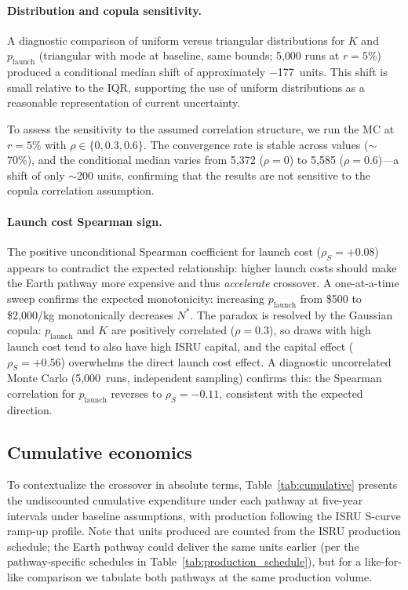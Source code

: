 \documentclass[preprint,12pt]{elsarticle}
\begin{document}
\paragraph{Distribution and copula sensitivity.} A diagnostic comparison of uniform versus triangular distributions for $K$ and $p_{\mathrm{launch}}$ (triangular with mode at baseline, same bounds; 5{,}000 runs at $r = 5\%$) produced a conditional median shift of approximately $-$177~units. This shift is small relative to the IQR, supporting the use of uniform distributions as a reasonable representation of current uncertainty.

To assess the sensitivity to the assumed correlation structure, we run the MC at $r = 5\%$ with $\rho \in \{0, 0.3, 0.6\}$. The convergence rate is stable across values ($\sim$70\%), and the conditional median varies from 5{,}372 ($\rho = 0$) to 5{,}585 ($\rho = 0.6$)---a shift of only $\sim$200 units, confirming that the results are not sensitive to the copula correlation assumption.

\paragraph{Launch cost Spearman sign.} The positive unconditional Spearman coefficient for launch cost ($\rho_S = +0.08$) appears to contradict the expected relationship: higher launch costs should make the Earth pathway more expensive and thus \emph{accelerate} crossover. A one-at-a-time sweep confirms the expected monotonicity: increasing $p_{\mathrm{launch}}$ from \$500 to \$2{,}000/kg monotonically decreases $N^*$. The paradox is resolved by the Gaussian copula: $p_{\mathrm{launch}}$ and $K$ are positively correlated ($\rho = 0.3$), so draws with high launch cost tend to also have high ISRU capital, and the capital effect ($\rho_S = +0.56$) overwhelms the direct launch cost effect. A diagnostic uncorrelated Monte Carlo (5{,}000~runs, independent sampling) confirms this: the Spearman correlation for $p_{\mathrm{launch}}$ reverses to $\rho_S = -0.11$, consistent with the expected direction.

\subsection{Cumulative economics}

To contextualize the crossover in absolute terms, Table~\ref{tab:cumulative} presents the undiscounted cumulative expenditure under each pathway at five-year intervals under baseline assumptions, with production following the ISRU S-curve ramp-up profile. Note that units produced are counted from the ISRU production schedule; the Earth pathway could deliver the same units earlier (per the pathway-specific schedules in Table~\ref{tab:production_schedule}), but for a like-for-like comparison we tabulate both pathways at the same production volume.
\end{document}
